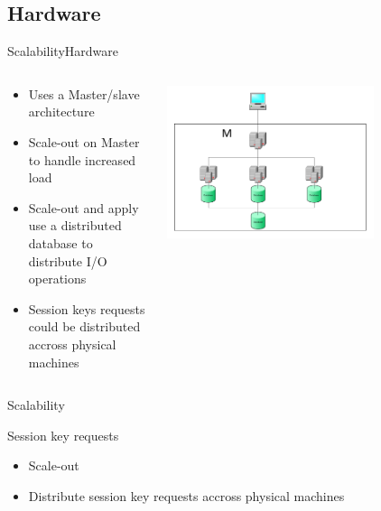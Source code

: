 \subsection{Hardware}
\begin{frame}{Scalability}{Hardware}
  \begin{columns}[T]
    \begin{column}{.5\textwidth}
     \begin{block}{}
    \begin{itemize}
  	\item Uses a Master/slave architecture
    \item Scale-out on Master to handle increased load
    \item Scale-out and apply use a distributed database to distribute I/O operations  
    \item Session keys requests could be distributed accross physical machines
    \end{itemize}
    \end{block}
    \end{column}
    \begin{column}{.5\textwidth}
    \begin{block}{}
    \begin{center}
    \includegraphics[width=0.7\textwidth]{images/master_scaling.pdf}
    \end{center}
    \end{block}
    \end{column}
\end{columns}
\end{frame}

\begin{frame}{Scalability}{}
\begin{block}{Session key requests}
  \begin{itemize}
    \item Scale-out
    \item Distribute session key requests accross physical machines
  \end{itemize}
\end{block}
\end{frame}

